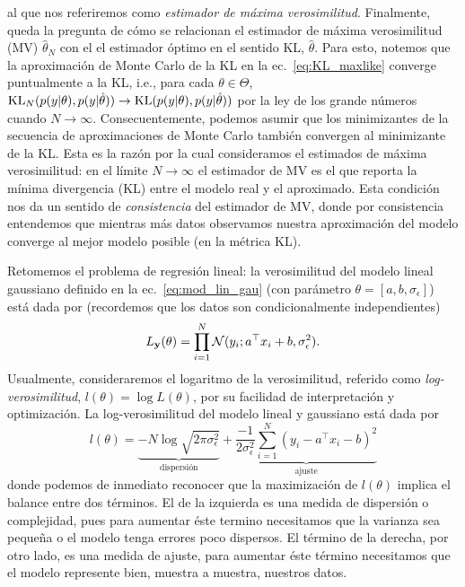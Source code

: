  al que nos  referiremos como \emph{estimador de máxima verosimilitud}. Finalmente, queda la pregunta de cómo se relacionan el estimador de máxima verosimilitud (MV) $\hat\theta_N$ con el el estimador óptimo en el sentido KL, $\hat\theta$. Para esto, notemos que la aproximación de Monte Carlo de la KL en la ec.~\eqref{eq:KL_maxlike} converge puntualmente a la KL,  i.e., para cada $\theta\in\Theta$,  $\operatorname{\text{KL}}_N( p(y|\theta),p(y|\hat\theta))\to \operatorname{\text{KL}}( p(y|\theta),p(y|\hat\theta))$ por la ley de los grande números  cuando $N\to\infty$. Consecuentemente, podemos asumir que los minimizantes  de la secuencia de aproximaciones de Monte Carlo también convergen al minimizante de la KL. Esta es la razón por la cual consideramos el estimados de máxima verosimilitud: en el límite $N\to \infty$ el estimador de MV es el que reporta la mínima divergencia (KL) entre  el modelo real y el aproximado. Esta condición nos da un sentido de \emph{consistencia} del estimador de MV, donde por consistencia entendemos que mientras más datos observamos nuestra aproximación del modelo converge al mejor modelo posible (en la métrica KL). 


Retomemos el problema  de regresión lineal: la verosimilitud del modelo lineal gaussiano  definido en la ec.~\eqref{eq:mod_lin_gau} (con parámetro $\theta  = [a,b,\sigma_\epsilon]$) está dada por (recordemos  que  los datos son condicionalmente independientes)
\begin{equation}
	L_{\mathbf{y}}(\theta) =  \prod_{i=1}^N {\mathcal N}(y_i;a^\top x_i + b,\sigma_\epsilon^2). \label{eq:verosimilitud_lineal}
\end{equation} 
Usualmente, consideraremos el logaritmo de la verosimilitud, referido como \emph{log-verosimilitud}, $l(\theta) = \log L(\theta)$, por su facilidad de interpretación y optimización. La log-verosimilitud del modelo lineal y gaussiano está dada por
\begin{equation}
	l(\theta) 
		= \underbrace{-N\log \sqrt{2\pi\sigma^2_\epsilon}}_{\text{dispersión}} + \underbrace{\frac{-1}{2\sigma_\epsilon^2} \sum_{i=1}^N (y_i-a^\top x_i - b)^2}_{\text{ajuste}}
\end{equation}
donde podemos de inmediato reconocer que la maximización de $l(\theta)$ implica el balance entre dos términos. El de la izquierda es una medida de dispersión o complejidad, pues para aumentar éste termino necesitamos que la varianza sea pequeña o el modelo tenga errores poco dispersos. El término de la derecha, por otro lado, es una medida de ajuste, para aumentar éste término necesitamos que el modelo  represente bien, muestra a muestra, nuestros datos. 

